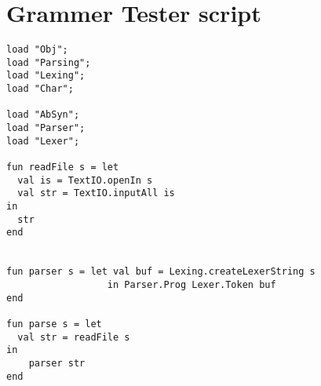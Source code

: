 \section{Grammer Tester script}
\begin{lstlisting}[style=paladim, caption=GrammaTester script]
load "Obj";
load "Parsing";
load "Lexing";
load "Char";

load "AbSyn";
load "Parser";
load "Lexer";

fun readFile s = let
  val is = TextIO.openIn s
  val str = TextIO.inputAll is  
in
  str 
end


fun parser s = let val buf = Lexing.createLexerString s
                  in Parser.Prog Lexer.Token buf
end

fun parse s = let
  val str = readFile s
in
    parser str
end
\end{lstlisting}
